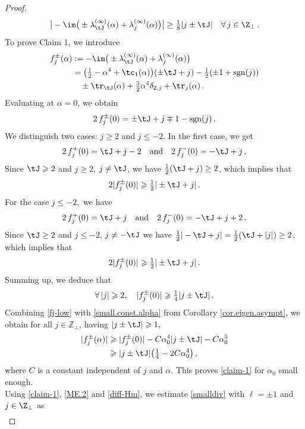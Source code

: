 \documentclass[a4paper,reqno,10pt]{article}
\begin{document}
\begin{proof}
    \begin{equation}\label{claim-1}
    	\big| -\im \big( \pm \lambda_{\tJ}^{(\infty)}(\alpha) + \lambda_{j}^{(\infty)}(\alpha) \big)  \big| \geq \tfrac18|j\pm \tJ| \quad \forall \, j \in\Z_{\perp} \,.
    \end{equation} 
To prove Claim 1, we introduce
\begin{align}
  		f_j^{\pm}(\alpha)&:=-\im \big( \pm \lambda_{\tJ}^{(\infty)}(\alpha)+ \lambda_{j}^{(\infty)}(\alpha) \big)  \\
        & = \big( \tfrac12 - \alpha^4 +\tc_{1}(\alpha)  \big)(\pm \tJ  +j) - \tfrac12(\pm 1 +{\rm sgn}(j)) \\
  		& \quad \pm \tr_{\tJ}(\alpha) + \tfrac32\alpha^4 \delta_{2,j} + \tr_{j}(\alpha)\,.\label{ell.pm1}
  	\end{align}
Evaluating at $\alpha=0$, we obtain
$$
2 \,f_j^{\pm}(0)=  \pm\tJ  + j\mp1-{\rm sgn}(j)\,.
$$
We distinguish two cases:  $j\geqslant2$ and $j\leqslant-2.$ In the first case, we get
$$
2 \,f_j^{+}(0)=  \tJ  + j-2\quad\hbox{and}\quad 2 \,f_j^{-}(0)= - \tJ  + j\,.
$$
Since $\tJ\geqslant2$ and $j\geqslant2$, $j\neq \tJ$, we have $\frac12(\tJ+j)\geq 2$, which implies that
$$
2|f_j^{\pm}(0)|\geqslant \tfrac12|\pm \tJ+j|\,.
$$
For  the case $j\leqslant-2,$ we have
$$
2 \,f_j^{+}(0)=  \tJ  + j\quad\hbox{and}\quad 2 \,f_j^{-}(0)= - \tJ  + j+2\,.
$$
Since $\tJ\geq 2$ and $j\leq -2$, $j\neq -\tJ$ we have $\frac12|-\tJ+j|=\frac12(\tJ+|j|)\geq 2$, which implies that
$$
2|f_j^{\pm}(0)|\geqslant \tfrac12|\pm \tJ+j|\,.
$$
Summing up, we deduce that
\begin{align}\label{fj-low}
\forall \,|j|\geqslant 2,\quad |f_j^{\pm}(0)|\geqslant \tfrac14|j\pm \tJ|\,.
\end{align}
Combining \eqref{fj-low} with \eqref{small.const.alpha} from Corollary \ref{cor.eigen.asympt}, we obtain for all $j \in \mathbb{Z}_\perp$, having $|j \pm \tJ| \geqslant 1,$
\begin{align}
    |f_j^\pm(\alpha)|& \geqslant |f_j^\pm(0)|-C\alpha_0^4|j\pm \tJ|-C\alpha_0^5\\
   & \geqslant |j\pm \tJ|\big(\tfrac14-2C\alpha_0^4\big) \,,
\end{align}
where  $C$ is a constant independent of $j$ and $\alpha.$ This proves \eqref{claim-1}  for $\alpha_0$ small enough.
  \\[1mm]
  Using \eqref{claim-1},  \eqref{ME.2} and \eqref{diff-Hm}, we estimate \eqref{smalldiv} with $\ell = \pm 1$  and $j\in \Z_{\perp}$ as
  \begin{align}

\end{align}
\end{proof}
\end{document}

